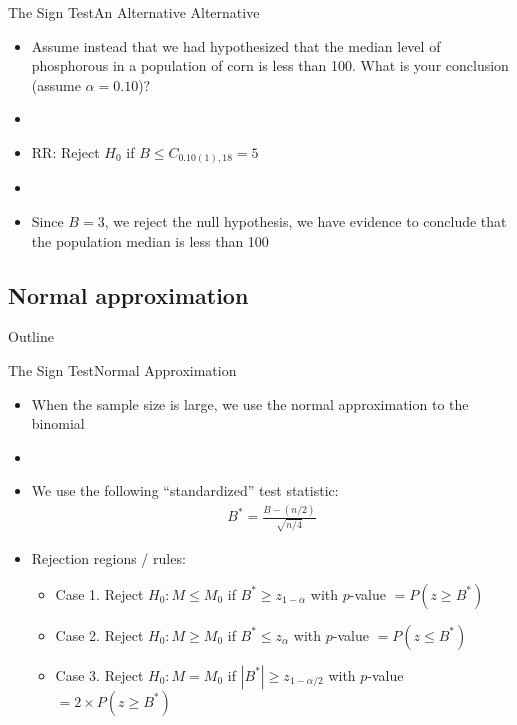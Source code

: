 \documentclass[xcolor=dvipsnames]{beamer}
\begin{document}
\begin{frame}{The Sign Test}{An Alternative Alternative}
\begin{itemize}
	\item Assume instead that we had hypothesized that the median level of phosphorous in a population of corn is less than 100. What is your conclusion (assume $\alpha = 0.10$)?
	\item[]
	\item RR: Reject $H_0$ if $B \leq C_{0.10(1), 18} = 5 $
	\item[]
	\item Since $B = 3$, we reject the null hypothesis, we have evidence to conclude that the population median is less than 100
\end{itemize}
\end{frame}

\subsection{Normal approximation}
\begin{frame}{Outline}
\tableofcontents[currentsection,subsectionstyle=show/shaded/hide]
\end{frame}

\begin{frame}{The Sign Test}{Normal Approximation}
	\begin{itemize}
		\item When the sample size is large, we use the normal approximation to the binomial
		\item[]
		\item We use the following ``standardized'' test statistic:
		\begin{gather*}
		B^* = \frac{B-(n/2)}{\sqrt{n/4}}
		\end{gather*}
		
		\item Rejection regions / rules: 
		\begin{itemize}
			\item Case 1. Reject $H_0: M \leq M_0$ if $B^* \geq z_{1-\alpha}$ with $p$-value $=P(z \geq B^*)$
			\item Case 2. Reject $H_0: M \geq M_0$ if $B^* \leq z_{\alpha}$ with $p$-value $=P(z \leq B^*)$
			\item Case 3. Reject $H_0: M = M_0$ if $|B^*| \geq z_{1-\alpha/2}$ with $p$-value $=2\times P(z \geq B^*)$
		\end{itemize}
	\end{itemize}
\end{frame}
\end{document}
